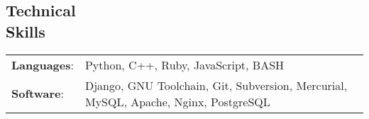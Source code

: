 \documentclass[margin]{res}
\begin{document}
\begin{resume}
    \section{Technical \\ Skills}
      \begin{tabular}{l p{3.6in}}
        \textbf{Languages}:                   & Python, C++, Ruby, JavaScript, BASH \\ [1pt]
        \textbf{Software}:                    & Django, GNU Toolchain, Git, Subversion, Mercurial, MySQL, Apache, Nginx, PostgreSQL \\ [1pt]
      \end{tabular}

  \end{resume} 
\end{document}
